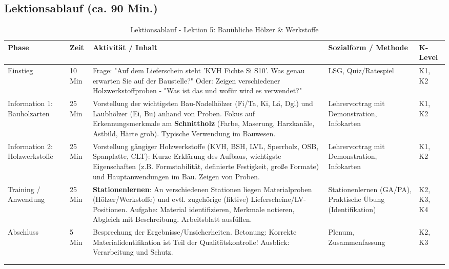 \documentclass[12pt, a4paper]{article}
\begin{document}
\subsection{Lektionsablauf (ca. 90 Min.)}
\begin{longtable}{|p{}|p{}|>{\raggedright\arraybackslash}p{}|p{}|p{}|}
    \hline
    \textbf{Phase} & \textbf{Zeit} & \textbf{Aktivität / Inhalt} & \textbf{Sozialform / Methode} & \textbf{K-Level} \\
    \hline
    \endhead

    Einstieg & 10 Min & Frage: "Auf dem Lieferschein steht 'KVH Fichte Si S10'. Was genau erwarten Sie auf der Baustelle?" Oder: Zeigen verschiedener Holzwerkstoffproben - "Was ist das und wofür wird es verwendet?" & LSG, Quiz/Ratespiel & K1, K2 \\
    \hline
    Information 1: Bauholzarten & 25 Min & Vorstellung der wichtigsten Bau-Nadelhölzer (Fi/Ta, Ki, Lä, Dgl) und Laubhölzer (Ei, Bu) anhand von Proben. Fokus auf Erkennungsmerkmale am \textbf{Schnittholz} (Farbe, Maserung, Harzkanäle, Astbild, Härte grob). Typische Verwendung im Bauwesen. & Lehrervortrag mit Demonstration, Infokarten & K1, K2 \\
    \hline
    Information 2: Holzwerkstoffe & 25 Min & Vorstellung gängiger Holzwerkstoffe (KVH, BSH, LVL, Sperrholz, OSB, Spanplatte, CLT): Kurze Erklärung des Aufbaus, wichtigste Eigenschaften (z.B. Formstabilität, definierte Festigkeit, große Formate) und Hauptanwendungen im Bau. Zeigen von Proben. & Lehrervortrag mit Demonstration, Infokarten & K1, K2 \\
    \hline
    Training / Anwendung & 25 Min & \textbf{Stationenlernen}: An verschiedenen Stationen liegen Materialproben (Hölzer/Werkstoffe) und evtl. zugehörige (fiktive) Lieferscheine/LV-Positionen. Aufgabe: Material identifizieren, Merkmale notieren, Abgleich mit Beschreibung. Arbeitsblatt ausfüllen. & Stationenlernen (GA/PA), Praktische Übung (Identifikation) & K2, K3, K4 \\
    \hline
    Abschluss & 5 Min & Besprechung der Ergebnisse/Unsicherheiten. Betonung: Korrekte Materialidentifikation ist Teil der Qualitätskontrolle! Ausblick: Verarbeitung und Schutz. & Plenum, Zusammenfassung & K2, K3 \\
    \hline
    \caption{Lektionsablauf - Lektion 5: Bauübliche Hölzer \& Werkstoffe} \\
    \label{tab:lektion5-bf}
\end{longtable}
\end{document}
